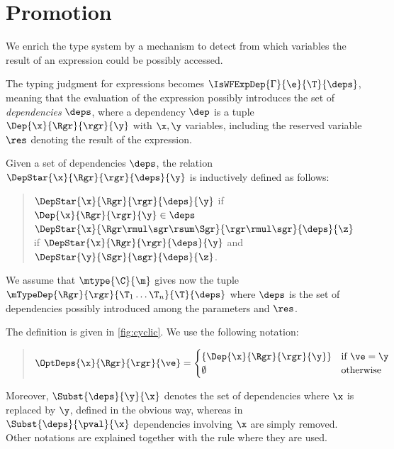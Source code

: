 \bez\section{Promotion}\label{sect:cyclic}\eez

\bez
We enrich the type system by a  mechanism to detect from which variables the result of an expression could be possibly accessed.


The typing judgment for expressions becomes $\IsWFExpDep{\Gamma}{\e}{\T}{\deps}$, meaning that the evaluation of the expression possibly introduces the set of \emph{dependencies} $\deps$, where
a dependency $\dep$ is a tuple $\Dep{\x}{\Rgr}{\rgr}{\y}$ with $\x,\y$ variables, including the reserved variable $\res$ denoting the result of the expression.

Given a set of dependencies $\deps$, the relation $\DepStar{\x}{\Rgr}{\rgr}{\deps}{\y}$ is inductively defined as follows:
\begin{quote}
$\DepStar{\x}{\Rgr}{\rgr}{\deps}{\y}$ if $\Dep{\x}{\Rgr}{\rgr}{\y}\in\deps$\\[1ex]
$\DepStar{\x}{\Rgr\rmul\sgr\rsum\Sgr}{\rgr\rmul\sgr}{\deps}{\z}$ if $\DepStar{\x}{\Rgr}{\rgr}{\deps}{\y}$ and $\DepStar{\y}{\Sgr}{\sgr}{\deps}{\z}$.
\end{quote}
\eez
 
%

We assume that $\mtype{\C}{\m}$ gives now the tuple $\mTypeDep{\Rgr}{\rgr}{\T_1\ldots\T_n}{\T}{\deps}$ where $\deps$ is the set of dependencies possibly introduced among the parameters and $\res$.

The definition is given in \cref{fig:cyclic}.  We use the following notation:
\begin{quote}
$\OptDeps{\x}{\Rgr}{\rgr}{\ve}=
\begin{cases}
\{\Dep{\x}{\Rgr}{\rgr}{\y}\}&\mbox{if}\ \ve=\y\\
\emptyset&\mbox{otherwise}
\end{cases}
$
\end{quote}
Moreover, $\Subst{\deps}{\y}{\x}$ denotes the set of dependencies where $\x$ is replaced by $\y$, defined in the obvious way, whereas in $\Subst{\deps}{\pval}{\x}$ dependencies involving $\x$ are simply removed.
Other notations are explained together with the rule where they are used.


